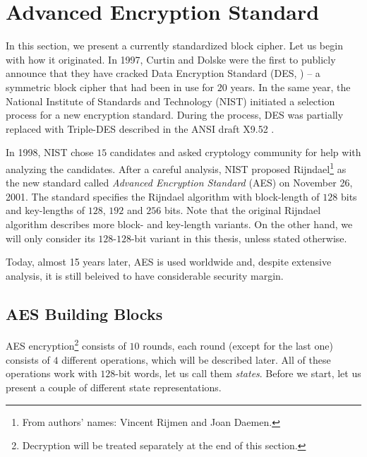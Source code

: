 \section{Advanced Encryption Standard}
\label{sec:aes}

In this section, we present a currently standardized block cipher. Let us begin with how it originated. In 1997, Curtin and Dolske were the first to publicly announce \cite{curtin1998brute} that they have cracked Data Encryption Standard (DES, \cite{fips1977des}) -- a symmetric block cipher that had been in use for $20$ years. In the same year, the National Institute of Standards and Technology (NIST) initiated a selection process for a new encryption standard. During the process, DES was partially replaced with Triple-DES described in the ANSI draft X9.52 \cite{americantripple}.

In 1998, NIST chose $15$ candidates and asked cryptology community for help with analyzing the candidates. After a careful analysis, NIST proposed Rijndael\footnote{From authors' names: Vincent Rijmen and Joan Daemen.} \cite{daemen1999aes} as the new standard called {\em Advanced Encryption Standard} (AES) \cite{fips2001aes} on November 26, 2001. The standard specifies the Rijndael algorithm with block-length of $128$ bits and key-lengths of $128$, $192$ and $256$ bits. Note that the original Rijndael algorithm \cite{daemen2013rijndael} describes more block- and key-length variants. On the other hand, we will only consider its $128$-$128$-bit variant in this thesis, unless stated otherwise.

Today, almost 15 years later, AES is used worldwide and, despite extensive analysis, it is still beleived to have considerable security margin.



\subsection{AES Building Blocks}

AES encryption\footnote{Decryption will be treated separately at the end of this section.} consists of $10$ rounds, each round (except for the last one) consists of $4$ different operations, which will be described later. All of these operations work with $128$-bit words, let us call them {\em states}. Before we start, let us present a couple of different state representations. 

